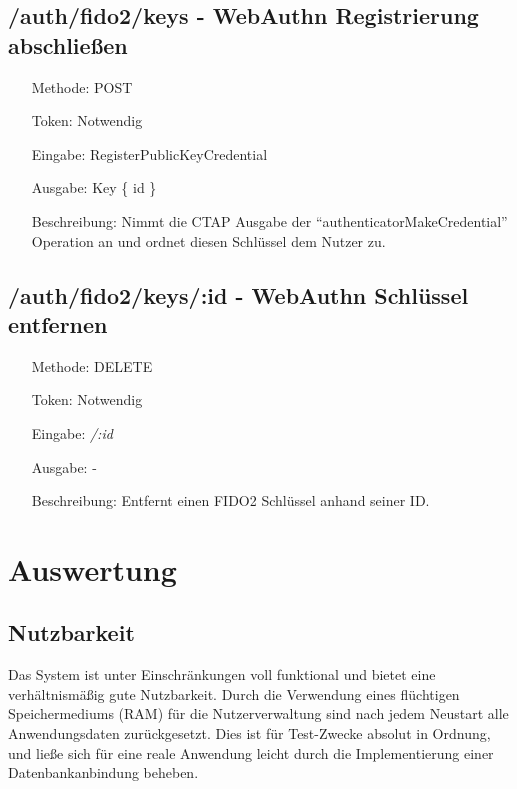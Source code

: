 \documentclass[journal]{IEEEtran}
\begin{document}
\subsection{/auth/fido2/keys - WebAuthn Registrierung abschließen}

\begin{itemize}
	\setlength{\leftskip}{1.5cm}
	\setlength{\itemsep}{0pt}
	\item[Methode:] POST
	\item[Token:] Notwendig
	\item[Eingabe:] RegisterPublicKeyCredential 
	\item[Ausgabe:] Key \{ id \}
	\item[Beschreibung:] Nimmt die CTAP Ausgabe der
		``authenticatorMakeCredential'' Operation an und ordnet diesen
		Schlüssel dem Nutzer zu.
\end{itemize}

\subsection{/auth/fido2/keys/:id - WebAuthn Schlüssel entfernen}

\begin{itemize}
	\setlength{\leftskip}{1.5cm}
	\setlength{\itemsep}{0pt}
	\item[Methode:] DELETE
	\item[Token:] Notwendig
	\item[Eingabe:] \textit{/:id}
	\item[Ausgabe:] -
	\item[Beschreibung:] Entfernt einen FIDO2 Schlüssel anhand seiner ID.\@
\end{itemize}

\section{Auswertung}

\subsection{Nutzbarkeit}

Das System ist unter Einschränkungen voll funktional und bietet eine
verhältnismäßig gute Nutzbarkeit. Durch die Verwendung eines flüchtigen
Speichermediums (RAM) für die Nutzerverwaltung sind nach jedem Neustart alle
Anwendungsdaten zurückgesetzt. Dies ist für Test-Zwecke absolut in Ordnung, und
ließe sich für eine reale Anwendung leicht durch die Implementierung einer
Datenbankanbindung beheben.
\end{document}
